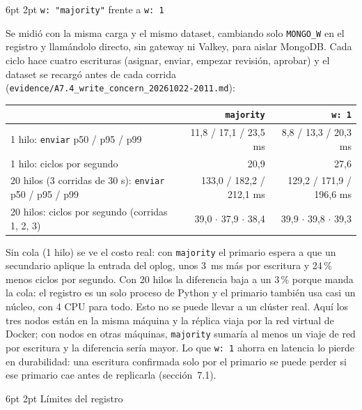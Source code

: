 \documentclass[10pt,letterpaper]{article}
\makeatletter
\newcommand{\ev}[1]{{\footnotesize\texttt{evidence/\allowbreak #1}}}
\renewcommand\subsection{\@startsection{subsection}{2}{\z@}%
  {6pt \@plus 1pt}{2pt}%
  {\normalfont\normalsize\bfseries\color{acc}}}
\makeatother
\begin{document}
\subsection{\texttt{w: "majority"} frente a \texttt{w: 1}}

Se midió con la misma carga y el mismo dataset, cambiando solo \texttt{MONGO\_W} en el registro y
llamándolo directo, sin gateway ni Valkey, para aislar MongoDB. Cada ciclo hace cuatro escrituras (asignar,
enviar, empezar revisión, aprobar) y el dataset se recargó antes de cada corrida
(\ev{A7.4\_write\_concern\_20261022-2011.md}):

\begin{center}\small
\begin{tabular}{@{}lrr@{}}
\toprule
 & \texttt{majority} & \texttt{w: 1} \\
\midrule
1 hilo: \texttt{enviar} p50 / p95 / p99 & 11,8 / 17,1 / 23,5 ms & 8,8 / 13,3 / 20,3 ms \\
1 hilo: ciclos por segundo & 20,9 & 27,6 \\
20 hilos (3 corridas de 30 s): \texttt{enviar} p50 / p95 / p99 & 133,0 / 182,2 / 212,1 ms & 129,2 / 171,9 / 196,6 ms \\
20 hilos: ciclos por segundo (corridas 1, 2, 3) & 39,0 $\cdot$ 37,9 $\cdot$ 38,4 & 39,9 $\cdot$ 39,8 $\cdot$ 39,3 \\
\bottomrule
\end{tabular}
\end{center}

Sin cola (1 hilo) se ve el costo real: con \texttt{majority} el primario espera a que un secundario aplique
la entrada del oplog, unos 3~ms más por escritura y 24\,\% menos ciclos por segundo. Con 20 hilos la
diferencia baja a un 3\,\% porque manda la cola: el registro es un solo proceso de Python y el primario
también usa casi un núcleo, con 4 CPU para todo. Esto no se puede llevar a un clúster real. Aquí los tres
nodos están en la misma máquina y la réplica viaja por la red virtual de Docker; con nodos en otras máquinas,
\texttt{majority} sumaría al menos un viaje de red por escritura y la diferencia sería mayor. Lo que
\texttt{w: 1} ahorra en latencia lo pierde en durabilidad: una escritura confirmada solo por el primario se
puede perder si ese primario cae antes de replicarla (sección~7.1).

\subsection{Límites del registro}
\end{document}
